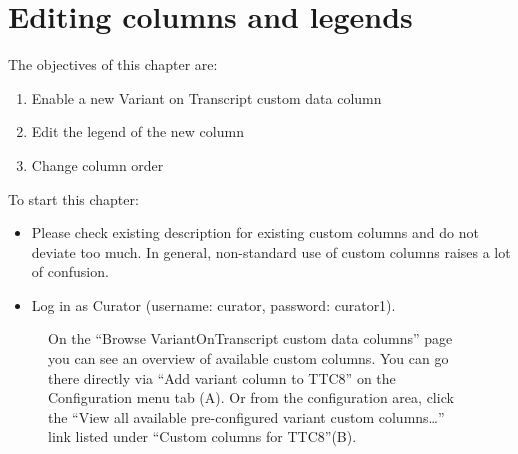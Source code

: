 \chapter{Editing columns and legends}
\label{edit_columns_legends}
The objectives of this chapter are:
\begin{enumerate}
	\item 
	Enable a new Variant on Transcript custom data column
	\item 
	Edit the legend of the new column
	\item
	Change column order
\end{enumerate}
To start this chapter:
\begin{itemize}
	\item
	Please check existing description for existing custom columns and do not deviate too much. 
	In general, non-standard use of custom columns raises a lot of confusion.
	\item
	Log in as Curator (username: curator, password: curator1).
\end{itemize}

\begin{figure}[ht]
  \begin{shaded}
	  \caption{On the ``Browse VariantOnTranscript custom data columns'' page you can see an overview of available 
	   custom columns.
	   You can go there directly via ``Add variant column to TTC8'' on the Configuration menu tab (A). 
		Or from the configuration area, click the ``View all available pre-configured variant custom columns\ldots'' 
		 link listed under	``Custom columns for TTC8''(B).}
		\label{fig:edit_column_I}
  \end{shaded}
\end{figure}


